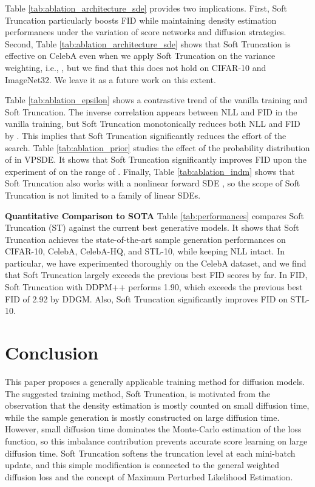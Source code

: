 \documentclass[nohyperref]{article}
\theoremstyle{plain}
\theoremstyle{definition}
\theoremstyle{remark}
\begin{document}
Table \ref{tab:ablation_architecture_sde} provides two implications. First, Soft Truncation particularly boosts FID while maintaining density estimation performances under the variation of score networks and diffusion strategies. Second, Table \ref{tab:ablation_architecture_sde} shows that Soft Truncation is effective on CelebA even when we apply Soft Truncation on the variance weighting, i.e., , but we find that this does not hold on CIFAR-10 and ImageNet32. We leave it as a future work on this extent.

Table \ref{tab:ablation_epsilon} shows a contrastive trend of the vanilla training and Soft Truncation. The inverse correlation appears between NLL and FID in the vanilla training, but Soft Truncation monotonically reduces both NLL and FID by . This implies that Soft Truncation significantly reduces the effort of the  search. Table \ref{tab:ablation_prior} studies the effect of the probability distribution of  in VPSDE. It shows that Soft Truncation significantly improves FID upon the experiment of  on the range of . Finally, Table \ref{tab:ablation_indm} shows that Soft Truncation also works with a nonlinear forward SDE \cite{kim2022maximum}, so the scope of Soft Truncation is not limited to a family of linear SDEs.

\textbf{Quantitative Comparison to SOTA} Table \ref{tab:performances} compares Soft Truncation (ST) against the current best generative models. It shows that Soft Truncation achieves the state-of-the-art sample generation performances on CIFAR-10, CelebA, CelebA-HQ, and STL-10, while keeping NLL intact. In particular, we have experimented thoroughly on the CelebA dataset, and we find that Soft Truncation largely exceeds the previous best FID scores by far. In FID, Soft Truncation with DDPM++ performs 1.90, which exceeds the previous best FID of 2.92 by DDGM. Also, Soft Truncation significantly improves FID on STL-10.

\section{Conclusion}

This paper proposes a generally applicable training method for diffusion models. The suggested training method, Soft Truncation, is motivated from the observation that the density estimation is mostly counted on small diffusion time, while the sample generation is mostly constructed on large diffusion time. However, small diffusion time dominates the Monte-Carlo estimation of the loss function, so this imbalance contribution prevents accurate score learning on large diffusion time. Soft Truncation softens the truncation level at each mini-batch update, and this simple modification is connected to the general weighted diffusion loss and the concept of Maximum Perturbed Likelihood Estimation.
\end{document}
